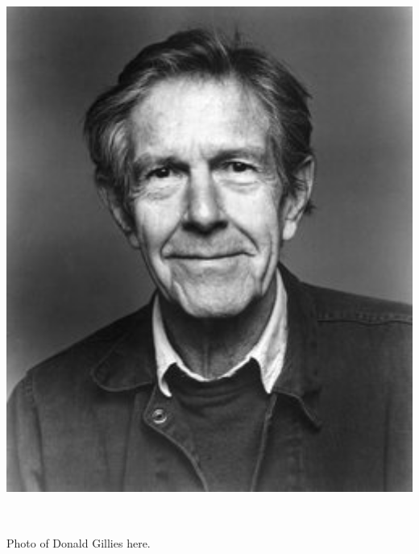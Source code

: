 \documentclass[17pt]{extarticle}
\begin{document}
\begin{center}
  \includegraphics[height=7in]{images/john-cage-portrait.jpg}
\end{center}

\newpage


\vspace*{2in}
{\Huge

  \begin{center}

    Photo of Donald Gillies here.

    \end{center}

}

\newpage
\end{document}
